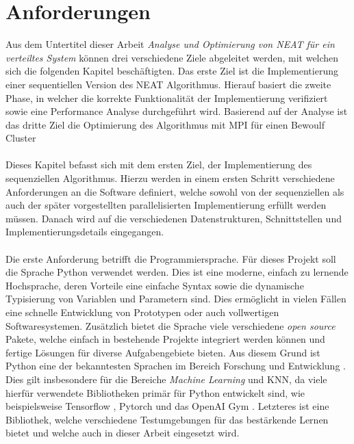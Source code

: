 \section{Anforderungen}
Aus dem Untertitel dieser Arbeit \emph{Analyse und Optimierung von \ac{NEAT} für ein verteiltes System} können drei verschiedene Ziele abgeleitet werden, mit welchen sich die folgenden Kapitel beschäftigten. Das erste Ziel ist die Implementierung einer sequentiellen Version des \ac{NEAT} Algorithmus. Hierauf basiert die zweite Phase, in welcher die korrekte Funktionalität der Implementierung verifiziert sowie eine Performance Analyse durchgeführt wird. 
Basierend auf der Analyse ist das dritte Ziel die Optimierung des Algorithmus mit \ac{MPI} für einen Bewoulf Cluster
\\\\
Dieses Kapitel befasst sich mit dem ersten Ziel, der Implementierung des sequenziellen Algorithmus. Hierzu werden in einem ersten Schritt verschiedene Anforderungen an die Software definiert, welche sowohl von der sequenziellen als auch der später vorgestellten parallelisierten Implementierung erfüllt werden müssen. Danach wird auf die verschiedenen Datenstrukturen, Schnittstellen und Implementierungsdetails eingegangen.
\\\\
Die erste Anforderung betrifft die Programmiersprache. Für dieses Projekt soll die Sprache Python verwendet werden. Dies ist eine moderne, einfach zu lernende Hochsprache, deren Vorteile eine einfache Syntax sowie die dynamische Typisierung von Variablen und Parametern sind. Dies ermöglicht in vielen Fällen eine schnelle Entwicklung von Prototypen oder auch vollwertigen Softwaresystemen. Zusätzlich bietet die Sprache viele verschiedene \emph{open source} Pakete, welche einfach in bestehende Projekte integriert werden können und fertige Lösungen für diverse Aufgabengebiete bieten. Aus diesem Grund ist Python eine der bekanntesten Sprachen im Bereich Forschung und Entwicklung \cite{dalcin2011parallel}. Dies gilt insbesondere für die Bereiche \emph{Machine Learning} und \ac{KNN}, da viele hierfür verwendete Bibliotheken primär für Python entwickelt sind, wie beispielsweise Tensorflow \cite{tensorflow2015}, Pytorch \cite{pytorch2019} und das OpenAI Gym \cite{OpenAiGym2016}. Letzteres ist eine Bibliothek, welche verschiedene Testumgebungen für das bestärkende Lernen bietet und welche auch in dieser Arbeit eingesetzt wird.  
\\\\
